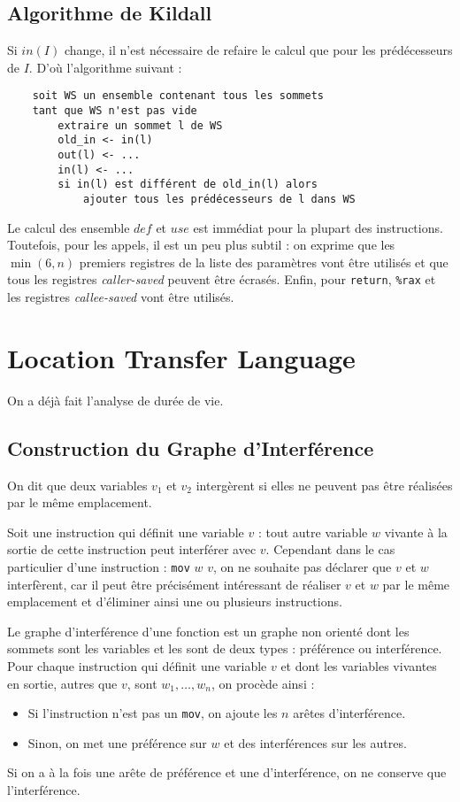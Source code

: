 \documentclass{cours}
\begin{document}
\subsection{Algorithme de Kildall}
Si $in(I)$ change, il n'est nécessaire de refaire le calcul que pour les prédécesseurs de $I$.  D'où l'algorithme suivant :
\begin{verbatim}
    soit WS un ensemble contenant tous les sommets
    tant que WS n'est pas vide
        extraire un sommet l de WS
        old_in <- in(l)
        out(l) <- ...
        in(l) <- ...
        si in(l) est différent de old_in(l) alors
            ajouter tous les prédécesseurs de l dans WS
\end{verbatim}

Le calcul des ensemble $def$ et $use$ est immédiat pour la plupart des instructions. Toutefois, pour les appels, il est un peu plus subtil : on exprime que les $\min(6, n)$ premiers registres de la liste des paramètres vont être utilisés et que tous les registres \textit{caller-saved} peuvent être écrasés. Enfin, pour \texttt{return}, \texttt{\%rax} et les registres \textit{callee-saved} vont être utilisés.

\section{Location Transfer Language}
On a déjà fait l'analyse de durée de vie.
\subsection{Construction du Graphe d'Interférence}
\begin{definition}
    On dit que deux variables $v_{1}$ et $v_{2}$ intergèrent si elles ne peuvent pas être réalisées par le même emplacement.
\end{definition}

Soit une instruction qui définit une variable $v$ : tout autre variable $w$ vivante à la sortie de cette instruction peut interférer avec $v$. Cependant dans le cas particulier d'une instruction : \texttt{mov} $w$ $v$, on ne souhaite pas déclarer que $v$ et $w$ interfèrent, car il peut être précisément intéressant de réaliser $v$ et $w$ par le même emplacement et d'éliminer ainsi une ou plusieurs instructions.
\begin{definition}
    Le graphe d'interférence d'une fonction est un graphe non orienté dont les sommets sont les variables et les sont de deux types : préférence ou interférence. \\
    Pour chaque instruction qui définit une variable $v$ et dont les variables vivantes en sortie, autres que $v$, sont $w_{1}, \ldots, w_{n}$, on procède ainsi :
    \begin{itemize}
        \item Si l'instruction n'est pas un \texttt{mov}, on ajoute les $n$ arêtes d'interférence.
        \item Sinon, on met une préférence sur $w$ et des interférences sur les autres.
    \end{itemize}
    Si on a à la fois une arête de préférence et une d'interférence, on ne conserve que l'interférence.
\end{definition}
\end{document}
